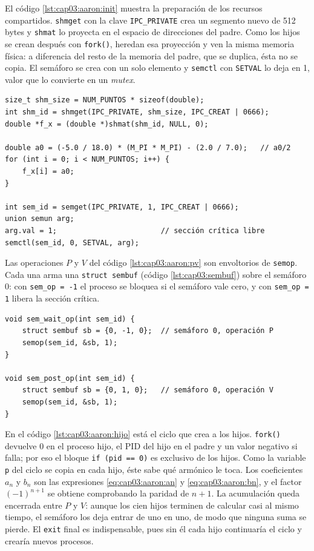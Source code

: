 El código \ref{lst:cap03:aaron:init} muestra la preparación de los recursos compartidos. \texttt{shmget} con la clave \texttt{IPC\_PRIVATE} crea un segmento nuevo de 512 bytes y \texttt{shmat} lo proyecta en el espacio de direcciones del padre. Como los hijos se crean después con \texttt{fork()}, heredan esa proyección y ven la misma memoria física: a diferencia del resto de la memoria del padre, que se duplica, ésta no se copia. El semáforo se crea con un solo elemento y \texttt{semctl} con \texttt{SETVAL} lo deja en 1, valor que lo convierte en un \textit{mutex}.

\begin{lstlisting}[style=C, caption={Creación de la memoria compartida y del semáforo en el proceso padre.}, label={lst:cap03:aaron:init}]
size_t shm_size = NUM_PUNTOS * sizeof(double);
int shm_id = shmget(IPC_PRIVATE, shm_size, IPC_CREAT | 0666);
double *f_x = (double *)shmat(shm_id, NULL, 0);

double a0 = (-5.0 / 18.0) * (M_PI * M_PI) - (2.0 / 7.0);   // a0/2
for (int i = 0; i < NUM_PUNTOS; i++) {
    f_x[i] = a0;
}

int sem_id = semget(IPC_PRIVATE, 1, IPC_CREAT | 0666);
union semun arg;
arg.val = 1;                        // sección crítica libre
semctl(sem_id, 0, SETVAL, arg);
\end{lstlisting}

Las operaciones $P$ y $V$ del código \ref{lst:cap03:aaron:pv} son envoltorios de \texttt{semop}. Cada una arma una \texttt{struct sembuf} (código \ref{lst:cap03:sembuf}) sobre el semáforo 0: con \texttt{sem\_op = -1} el proceso se bloquea si el semáforo vale cero, y con \texttt{sem\_op = 1} libera la sección crítica.

\begin{lstlisting}[style=C, caption={Operaciones $P$ (\texttt{sem\_wait\_op}) y $V$ (\texttt{sem\_post\_op}) sobre el semáforo.}, label={lst:cap03:aaron:pv}]
void sem_wait_op(int sem_id) {
    struct sembuf sb = {0, -1, 0};  // semáforo 0, operación P
    semop(sem_id, &sb, 1);
}

void sem_post_op(int sem_id) {
    struct sembuf sb = {0, 1, 0};   // semáforo 0, operación V
    semop(sem_id, &sb, 1);
}
\end{lstlisting}

En el código \ref{lst:cap03:aaron:hijo} está el ciclo que crea a los hijos. \texttt{fork()} devuelve 0 en el proceso hijo, el PID del hijo en el padre y un valor negativo si falla; por eso el bloque \texttt{if (pid == 0)} es exclusivo de los hijos. Como la variable \texttt{p} del ciclo se copia en cada hijo, éste sabe qué armónico le toca. Los coeficientes $a_n$ y $b_n$ son las expresiones \eqref{eq:cap03:aaron:an} y \eqref{eq:cap03:aaron:bn}, y el factor $(-1)^{n+1}$ se obtiene comprobando la paridad de $n+1$. La acumulación queda encerrada entre $P$ y $V$: aunque los cien hijos terminen de calcular casi al mismo tiempo, el semáforo los deja entrar de uno en uno, de modo que ninguna suma se pierde. El \texttt{exit} final es indispensable, pues sin él cada hijo continuaría el ciclo y crearía nuevos procesos.

